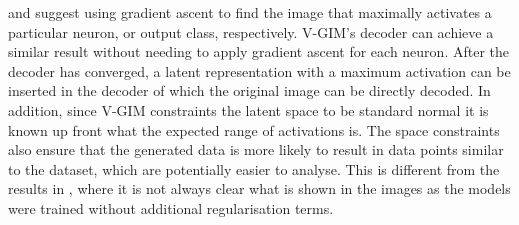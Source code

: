 \cite{erhanVisualizingHigherLayerFeatures2009} and \cite{simonyanDeepConvolutionalNetworks2014} suggest using gradient ascent to find the image that maximally activates a particular neuron, or output class, respectively. V-GIM's decoder can achieve a similar result without needing to apply gradient ascent for each neuron. After the decoder has converged, a latent representation with a maximum activation can be inserted in the decoder of which the original image can be directly decoded. In addition, since V-GIM constraints the latent space to be standard normal it is known up front what the expected range of activations is. The space constraints also ensure that the generated data is more likely to result in data points similar to the dataset, which are potentially easier to analyse. This is different from the results in \cite{erhanVisualizingHigherLayerFeatures2009, simonyanDeepConvolutionalNetworks2014}, where it is not always clear what is shown in the images as the models were trained without additional regularisation terms. 






%
%
%













